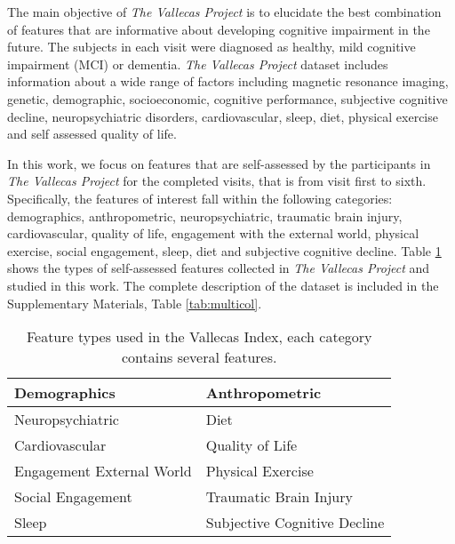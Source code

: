 \documentclass[preprint,12pt]{elsarticle}
\begin{document}
The main objective of \emph{The Vallecas Project} is to elucidate the best combination of features  that are informative about developing cognitive impairment in the future. The subjects in each visit were diagnosed as healthy, mild cognitive impairment (MCI) or dementia. \emph{The Vallecas Project} dataset includes information about a wide range of factors including magnetic resonance imaging, genetic, demographic, socioeconomic, cognitive performance, subjective cognitive decline, neuropsychiatric disorders, cardiovascular, sleep, diet, physical exercise and self assessed quality of life.

In this work, we focus on features that are self-assessed by the participants in \emph{The Vallecas Project} for the completed visits, that is from visit first to sixth. Specifically, the features of interest fall within the following categories: demographics, anthropometric, neuropsychiatric, traumatic brain injury, cardiovascular, quality of life, engagement with the external world, physical exercise, social engagement, sleep, diet and subjective cognitive decline. Table \ref{tab:pvall} shows the types of self-assessed features collected in \emph{The Vallecas Project} and studied in this work. 
The complete description of the dataset is included in the Supplementary Materials, Table \ref{tab:multicol}.

\begin{table}[h!]
  \begin{center}
   \caption{Feature types used in the Vallecas Index, each category contains several features.}
    \label{tab:pvall}
\begin{tabular}{ |p{6cm}||p{6cm}|  }
\hline
Demographics & Anthropometric\\
\hline
Neuropsychiatric & Diet\\
\hline
Cardiovascular & Quality of Life\\
\hline
Engagement External World & Physical Exercise\\
\hline
Social Engagement & Traumatic Brain Injury\\
\hline
Sleep & Subjective Cognitive Decline\\
\hline
\end{tabular}
\end{center}
\end{table}
\end{document}
